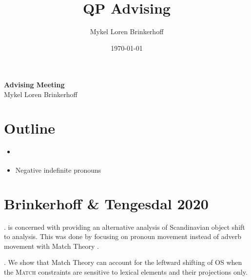 \documentclass[12pt, letterpaper]{article}
\title{QP Advising}
\author{Mykel Loren Brinkerhoff}
\date{\today}
\begin{document}
	
	\setlength{\Extopsep}{6pt}
	\setlength{\Exlabelsep}{9pt}		%
	
	
\begin{center}
	{\Large \textbf{Advising Meeting }}\\
	\vspace{6pt}
	Mykel Loren Brinkerhoff
\end{center}
\thispagestyle{fancy}

\section*{Outline}

\begin{itemize}
	\item \cite{brinkerhoffMATCHINGPhrasesNorwegian2020}
	\item Negative indefinite pronouns 
\end{itemize}

\section*{Brinkerhoff \& Tengesdal 2020}

\ex. \cite{brinkerhoffMATCHINGPhrasesNorwegian2020} is concerned with providing an alternative analysis of Scandinavian object shift to  analysis. This was done by focusing on pronoun movement instead of adverb movement with Match Theory \citep{selkirkClauseIntonationalPhrase2009, selkirkSyntaxPhonologyInterface2011}.

\ex. We show that Match Theory can account for the leftward shifting of OS when the \textsc{Match} constraints are sensitive to lexical elements and their projections only. 
\end{document}
